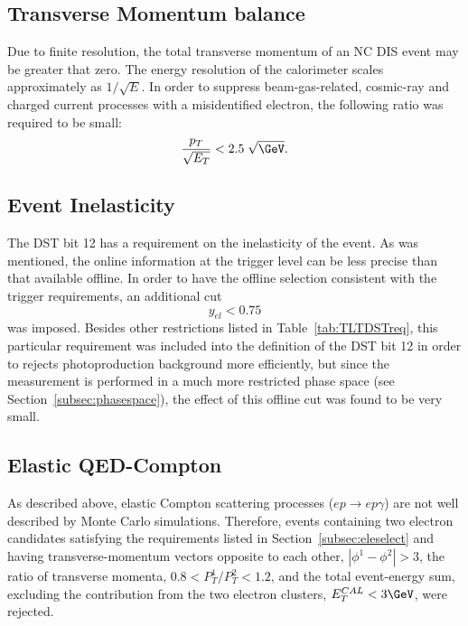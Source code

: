 \subsection{Transverse Momentum balance}
\label{subsec:empzcut}
Due to finite resolution, the total transverse momentum of an NC DIS event may be greater that zero. The energy resolution of the calorimeter scales approximately as $1/\sqrt{E}$. In order to suppress beam-gas-related, cosmic-ray and charged current processes with a misidentified electron, the following ratio was required to be small:
\begin{equation}
\frac{p_T}{\sqrt{E_T}} < 2.5\;\sqrt{\GeV}.
\label{eq:ptcut}
\end{equation}

\subsection{Event Inelasticity}
\label{subsec:yelcut}

The DST bit 12 has a requirement on the inelasticity of the event. As was mentioned, the online information at the trigger level can be less precise than that available offline. In order to have the offline selection consistent with the trigger requirements, an additional cut 
\begin{equation}
y_{el} < 0.75
\label{eq:yelcut}
\end{equation}
was imposed. Besides other restrictions listed in Table~\ref{tab:TLTDSTreq}, this particular requirement was included into the definition of the DST bit 12 in order to rejects photoproduction background more efficiently, but since the measurement is performed in a much more restricted phase space (see Section~\ref{subsec:phasespace}), the effect of this offline cut was found to be very small.

\subsection{Elastic QED-Compton}
\label{subsec:elasticqedcut}
As described above, elastic Compton scattering processes ($ep \rightarrow ep\gamma$) are not well described by Monte Carlo simulations. Therefore, events containing two electron candidates satisfying the requirements listed in Section~\ref{subsec:eleselect} and having transverse-momentum vectors opposite to each other, $\left|\phi^1 - \phi^2\right| > 3$, the ratio of transverse momenta, $0.8 < P_{T}^1/P_T^{2} < 1.2$, and the total event-energy sum, excluding the contribution from the two electron clusters, $E_T^{CAL} < 3 \GeV$, were rejected.

